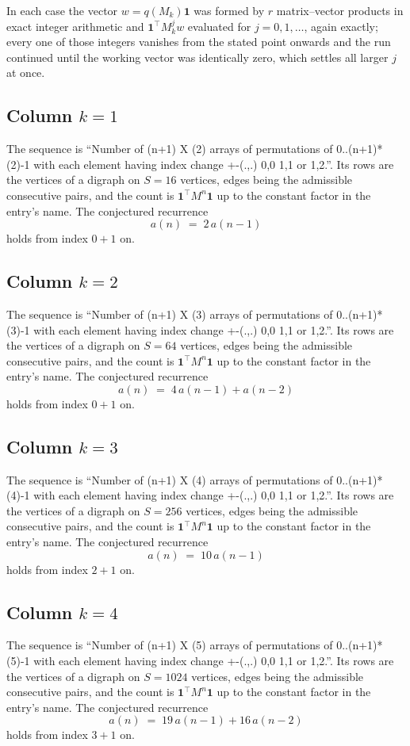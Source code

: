 \documentclass[11pt,a4paper]{article}
\theoremstyle{plain}
\theoremstyle{definition}
\begin{document}
In each case the vector $w=q(M_k)\mathbf{1}$ was formed by $r$ matrix--vector products in
exact integer arithmetic and $\mathbf{1}^{\!\top}M_k^{j}w$ evaluated for $j=0,1,\dots$,
again exactly; every one of those integers vanishes from the stated point onwards and the run
continued until the working vector was identically zero, which settles all larger $j$ at once.

\subsection*{Column $k$$=1$}
The sequence is ``Number of (n+1) X (2) arrays of permutations of 0..(n+1)*(2)-1 with each element having index change +-(.,.) 0,0 1,1 or 1,2.''. Its rows are the vertices of a digraph on
$S=16$ vertices, edges being the admissible consecutive pairs, and the count is
$\mathbf{1}^{\!\top}M^{n}\mathbf{1}$ up to the constant factor in the entry's name.
The conjectured recurrence
\[
a(n)\;=\;2\,a(n-1)
\]
holds from index $0+1$ on.

\subsection*{Column $k$$=2$}
The sequence is ``Number of (n+1) X (3) arrays of permutations of 0..(n+1)*(3)-1 with each element having index change +-(.,.) 0,0 1,1 or 1,2.''. Its rows are the vertices of a digraph on
$S=64$ vertices, edges being the admissible consecutive pairs, and the count is
$\mathbf{1}^{\!\top}M^{n}\mathbf{1}$ up to the constant factor in the entry's name.
The conjectured recurrence
\[
a(n)\;=\;4\,a(n-1) + a(n-2)
\]
holds from index $0+1$ on.

\subsection*{Column $k$$=3$}
The sequence is ``Number of (n+1) X (4) arrays of permutations of 0..(n+1)*(4)-1 with each element having index change +-(.,.) 0,0 1,1 or 1,2.''. Its rows are the vertices of a digraph on
$S=256$ vertices, edges being the admissible consecutive pairs, and the count is
$\mathbf{1}^{\!\top}M^{n}\mathbf{1}$ up to the constant factor in the entry's name.
The conjectured recurrence
\[
a(n)\;=\;10\,a(n-1)
\]
holds from index $2+1$ on.

\subsection*{Column $k$$=4$}
The sequence is ``Number of (n+1) X (5) arrays of permutations of 0..(n+1)*(5)-1 with each element having index change +-(.,.) 0,0 1,1 or 1,2.''. Its rows are the vertices of a digraph on
$S=1024$ vertices, edges being the admissible consecutive pairs, and the count is
$\mathbf{1}^{\!\top}M^{n}\mathbf{1}$ up to the constant factor in the entry's name.
The conjectured recurrence
\[
a(n)\;=\;19\,a(n-1) + 16\,a(n-2)
\]
holds from index $3+1$ on.
\end{document}
